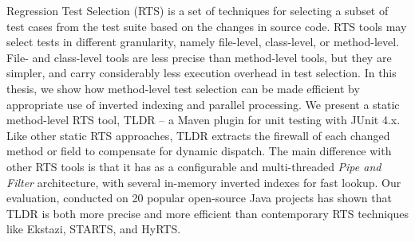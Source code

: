 \thesisabstract
{
Regression Test Selection (RTS) is a set of techniques for selecting a subset of test cases from the test suite based on the changes in source code. RTS tools may select tests in different granularity, namely file-level, class-level, or method-level. File- and class-level tools are less precise than method-level tools, but they are simpler, and carry considerably less execution overhead in test selection. In this thesis, we show how method-level test selection can be made efficient by appropriate use of inverted indexing and parallel processing. We present a static method-level RTS tool, TLDR -- a Maven plugin for unit testing with JUnit 4.x. Like other static RTS approaches, TLDR extracts the firewall of each changed method or field to compensate for dynamic dispatch. The main difference with other RTS tools is that it has as a configurable and multi-threaded \textit{Pipe and Filter} architecture, with several in-memory inverted indexes for fast lookup. Our evaluation, conducted on 20 popular open-source Java projects has shown that TLDR is both more precise and more efficient than contemporary RTS techniques like Ekstazi, STARTS, and HyRTS.

}


